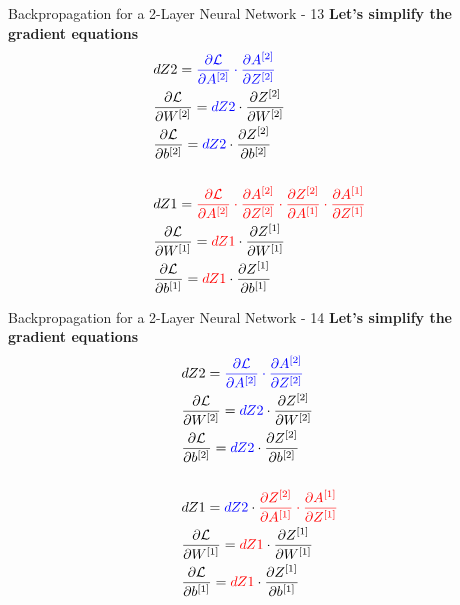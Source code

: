 \documentclass[aspectratio=169]{beamer}
\begin{document}
%
%
\begin{frame}{Backpropagation for a 2-Layer Neural Network - 13}
\textbf{Let's simplify the gradient equations}
\begin{align*}
&dZ2 = \textcolor{blue}{\frac{\partial \mathcal{L}}{\partial A^{[2]}} \cdot \frac{\partial A^{[2]}}{\partial Z^{[2]}}} 
\\
&\frac{\partial \mathcal{L}}{\partial W^{[2]}} = \textcolor{blue}{dZ2} \cdot\frac{\partial Z^{[2]}}{\partial W^{[2]}}
\\
&\frac{\partial \mathcal{L}}{\partial b^{[2]}} = \textcolor{blue}{dZ2} \cdot \frac{\partial Z^{[2]}}{\partial b^{[2]}}
\\
&\\
&dZ1 = \textcolor{red}{\frac{\partial \mathcal{L}}{\partial A^{[2]}} \cdot \frac{\partial A^{[2]}}{\partial Z^{[2]}} \cdot \frac{\partial Z^{[2]}}{\partial A^{[1]}} \cdot \frac{\partial A^{[1]}}{\partial Z^{[1]}}}
\\
&\frac{\partial \mathcal{L}}{\partial W^{[1]}} = \textcolor{red}{dZ1} \cdot \frac{\partial Z^{[1]}}{\partial W^{[1]}}
\\
&\frac{\partial \mathcal{L}}{\partial b^{[1]}} = \textcolor{red}{dZ1} \cdot \frac{\partial Z^{[1]}}{\partial b^{[1]}}
\end{align*}
\end{frame}
%
%
\begin{frame}{Backpropagation for a 2-Layer Neural Network - 14}
\textbf{Let's simplify the gradient equations}
\begin{align*}
&dZ2 = \textcolor{blue}{\frac{\partial \mathcal{L}}{\partial A^{[2]}} \cdot \frac{\partial A^{[2]}}{\partial Z^{[2]}}} 
\\
&\frac{\partial \mathcal{L}}{\partial W^{[2]}} = \textcolor{blue}{dZ2} \cdot\frac{\partial Z^{[2]}}{\partial W^{[2]}}
\\
&\frac{\partial \mathcal{L}}{\partial b^{[2]}} = \textcolor{blue}{dZ2} \cdot \frac{\partial Z^{[2]}}{\partial b^{[2]}}
\\
&\\
&dZ1 = \textcolor{blue}{dZ2} \cdot \textcolor{red}{\frac{\partial Z^{[2]}}{\partial A^{[1]}} \cdot \frac{\partial A^{[1]}}{\partial Z^{[1]}}}
\\
&\frac{\partial \mathcal{L}}{\partial W^{[1]}} = \textcolor{red}{dZ1} \cdot \frac{\partial Z^{[1]}}{\partial W^{[1]}}
\\
&\frac{\partial \mathcal{L}}{\partial b^{[1]}} = \textcolor{red}{dZ1} \cdot \frac{\partial Z^{[1]}}{\partial b^{[1]}}
\end{align*}
\end{frame}
\end{document}

